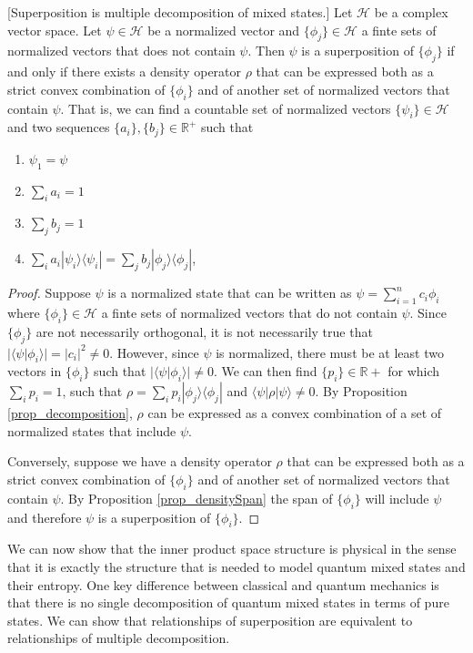 \documentclass[10pt,twocolumn, nofootinbib]{revtex4-2}
\def\>{\rangle}
\def\<{\langle}
\begin{document}
\begin{prop}\label{prop_superpositionIsDecomposition}[Superposition is multiple decomposition of mixed states.]
Let $\mathcal{H}$ be a complex vector space. Let $\psi \in \mathcal{H}$ be a normalized vector and $\{\phi_j\} \in \mathcal{H}$ a finte sets of normalized vectors that does not contain $\psi$. Then $\psi$ is a superposition of $\{\phi_j\}$ if and only if there exists a density operator $\rho$ that can be expressed both as a strict convex combination of $\{\phi_i\}$ and of another set of normalized vectors that contain $\psi$. That is, we can find a countable set of normalized vectors $\{\psi_i\} \in \mathcal{H}$ and two sequences $\{a_i\}, \{b_j\} \in \mathbb{R}^+$ such that
\begin{enumerate}
	\item $\psi_1 = \psi$
	\item $\sum_i a_i = 1$
	\item $\sum_j b_j = 1$
	\item $\sum_i a_i |\psi_i\>\<\psi_i| = \sum_j b_j |\phi_j\>\<\phi_j|$,
\end{enumerate}
\end{prop}

\begin{proof}
	Suppose $\psi$ is a normalized state that can be written as $\psi = \sum_{i=1}^n c_i \phi_i$ where $\{\phi_i\} \in \mathcal{H}$ a finte sets of normalized vectors that do not contain $\psi$. Since $\{\phi_j\}$ are not necessarily orthogonal, it is not necessarily true that $|\<\psi|\phi_i\>| = |c_i|^2 \neq 0$. However, since $\psi$ is normalized, there must be at least two vectors in $\{\phi_i\}$ such that $|\<\psi|\phi_i\>| \neq 0$. We can then find $\{p_i\} \in \mathbb{R}+$ for which $\sum_i p_i =1$, such that $\rho = \sum_i p_i |\phi_j\>\<\phi_j|$ and $\<\psi|\rho|\psi\> \neq 0$. By Proposition \ref{prop_decomposition}, $\rho$ can be expressed as a convex combination of a set of normalized states that include $\psi$.
	
	Conversely, suppose we have a density operator $\rho$ that can be expressed both as a strict convex combination of $\{\phi_i\}$ and of another set of normalized vectors that contain $\psi$. By Proposition \ref{prop_densitySpan} the span of $\{\phi_i\}$ will include $\psi$ and therefore $\psi$ is a superposition of $\{\phi_i\}$.
\end{proof}

We can now show that the inner product space structure is physical in the sense that it is exactly the structure that is needed to model quantum mixed states and their entropy. One key difference between classical and quantum mechanics is that there is no single decomposition of quantum mixed states in terms of pure states. We can show that relationships of superposition are equivalent to relationships of multiple decomposition.
\end{document}
